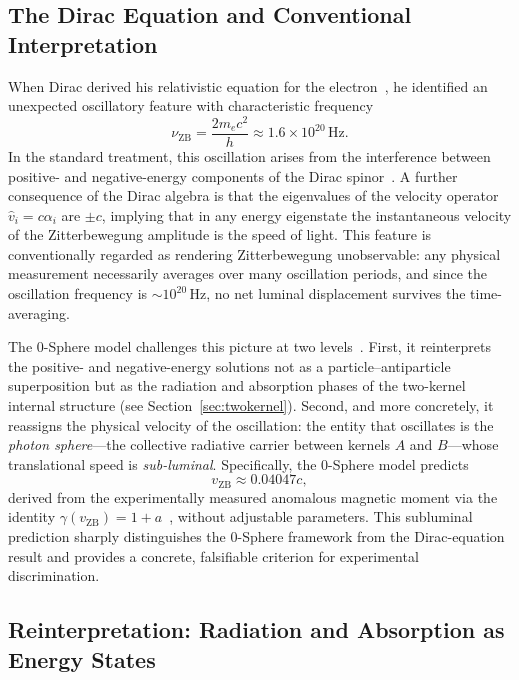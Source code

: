 \documentclass[12pt,letterpaper]{article}
\begin{document}
\subsection{The Dirac Equation and Conventional Interpretation}

When Dirac derived his relativistic equation for the electron~\cite{Dirac1928}, he identified an unexpected oscillatory feature with characteristic frequency
\begin{equation}
\nu_{\mathrm{ZB}} = \frac{2 m_e c^2}{h} \approx 1.6 \times 10^{20} \, \mathrm{Hz}.
\end{equation}
In the standard treatment, this oscillation arises from the interference between positive- and negative-energy components of the Dirac spinor~\cite{Schrodinger1930}. A further consequence of the Dirac algebra is that the eigenvalues of the velocity operator $\hat{v}_i = c\alpha_i$ are $\pm c$, implying that in any energy eigenstate the instantaneous velocity of the Zitterbewegung amplitude is the speed of light. This feature is conventionally regarded as rendering Zitterbewegung unobservable: any physical measurement necessarily averages over many oscillation periods, and since the oscillation frequency is $\sim 10^{20}\,\mathrm{Hz}$, no net luminal displacement survives the time-averaging.

The 0-Sphere model challenges this picture at two levels~\cite{hanamura17760132}. First, it reinterprets the positive- and negative-energy solutions not as a particle--antiparticle superposition but as the radiation and absorption phases of the two-kernel internal structure (see Section~\ref{sec:twokernel}). Second, and more concretely, it reassigns the physical velocity of the oscillation: the entity that oscillates is the \emph{photon sphere}---the collective radiative carrier between kernels $A$ and $B$---whose translational speed is \emph{sub-luminal}. Specifically, the 0-Sphere model predicts~\cite{hanamura18356895}
\begin{equation}
v_{\mathrm{ZB}} \approx 0.04047c,
\end{equation}
derived from the experimentally measured anomalous magnetic moment via the identity $\gamma(v_{\mathrm{ZB}}) = 1 + a$~\cite{hanamura17765409}, without adjustable parameters. This subluminal prediction sharply distinguishes the 0-Sphere framework from the Dirac-equation result and provides a concrete, falsifiable criterion for experimental discrimination.

\subsection{Reinterpretation: Radiation and Absorption as Energy States}
\end{document}
